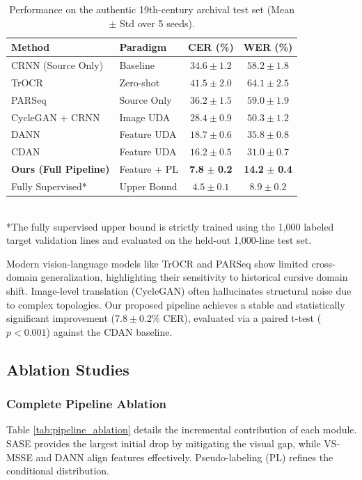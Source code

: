 \documentclass[11pt]{article}
\begin{document}
\begin{table}[htbp]
\centering
\caption{Performance on the authentic 19th-century archival test set (Mean $\pm$ Std over 5 seeds).}
\label{tab:main_results}
\begin{tabular}{l l c c}
\toprule
\textbf{Method} & \textbf{Paradigm} & \textbf{CER (\%)} & \textbf{WER (\%)} \\
\midrule
CRNN (Source Only) & Baseline & $34.6 \pm 1.2$ & $58.2 \pm 1.8$ \\
TrOCR \cite{li2021trocr} & Zero-shot & $41.5 \pm 2.0$ & $64.1 \pm 2.5$ \\
PARSeq \cite{bautista2022parseq} & Source Only & $36.2 \pm 1.5$ & $59.0 \pm 1.9$ \\
\midrule
CycleGAN + CRNN \cite{hoffman2018cycada} & Image UDA & $28.4 \pm 0.9$ & $50.3 \pm 1.2$ \\
DANN \cite{ganin2015unsupervised} & Feature UDA & $18.7 \pm 0.6$ & $35.8 \pm 0.8$ \\
CDAN \cite{long2018conditional} & Feature UDA & $16.2 \pm 0.5$ & $31.0 \pm 0.7$ \\
\midrule
\textbf{Ours (Full Pipeline)} & Feature + PL & \textbf{7.8} $\pm$ \textbf{0.2} & \textbf{14.2} $\pm$ \textbf{0.4} \\
\midrule
Fully Supervised* & Upper Bound & $4.5 \pm 0.1$ & $8.9 \pm 0.2$ \\
\bottomrule
\end{tabular}
\\
\vspace{1ex}
\footnotesize{*The fully supervised upper bound is strictly trained using the 1,000 labeled target validation lines and evaluated on the held-out 1,000-line test set.}
\end{table}

Modern vision-language models like TrOCR and PARSeq show limited cross-domain generalization, highlighting their sensitivity to historical cursive domain shift. Image-level translation (CycleGAN) often hallucinates structural noise due to complex topologies. Our proposed pipeline achieves a stable and statistically significant improvement ($7.8 \pm 0.2\%$ CER), evaluated via a paired t-test ($p < 0.001$) against the CDAN baseline.

\subsection{Ablation Studies}

\subsubsection{Complete Pipeline Ablation}
Table \ref{tab:pipeline_ablation} details the incremental contribution of each module. SASE provides the largest initial drop by mitigating the visual gap, while VS-MSSE and DANN align features effectively. Pseudo-labeling (PL) refines the conditional distribution.
\end{document}
